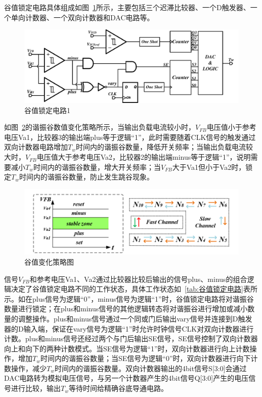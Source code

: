 谷值锁定电路具体组成如图~\ref{fig:谷值锁定电路1}所示，主要包括三个迟滞比较器、一个D触发器、一个单向计数器、一个双向计数器和DAC电路等。

\begin{figure}[htbp] 
    \centering
    \includegraphics[width=0.8\linewidth]{figures/谷值锁定电路1.pdf}
    \caption{谷值锁定电路1}
    \label{fig:谷值锁定电路1}
\end{figure} 

如图~\ref{fig:谷值变化策略}的谐振谷数值变化策略所示，当输出负载电流较小时，$V_{FB}$电压值小于参考电压Va1，比较器3的输出端plus等于逻辑“1”，此时需要随着CLK信号的触发通过双向计数器电路增加$T_w$时间内的谐振谷数量，降低开关频率；当输出负载电流较大时，$V_{FB}$电压值大于参考电压Va2，比较器2的输出端minus等于逻辑“1”，说明需要减小$T_w$时间内的谐振谷数量，增大开关频率；当$V_{FB}$大于Va1但小于Va2时，锁定$T_w$时间内的谐振谷数量，防止发生跳谷现象。

\begin{figure}[htbp] 
    \centering
    \includegraphics[width=0.8\linewidth]{figures/谷值变化策略.png}
    \caption{谷值变化策略图}
    \label{fig:谷值变化策略}
\end{figure} 

信号$V_{FB}$和参考电压Va1、Va2通过比较器比较后输出的信号plus、minus的组合逻辑决定了谷值锁定电路不同的工作状态，具体工作状态如~\ref{tab:谷值锁定电路}表所示。如在plus信号为逻辑“0”，minus信号为逻辑“1”时，谷值锁定电路将对谐振谷数量进行锁定；在plus和minus信号的其他逻辑转态将对谐振谷进行增加或减小数量的调整操作。plus和minus信号通过一个同或门后输出vary信号并连接到D触发器的D输入端，保证在vary信号为逻辑“1”时允许时钟信号CLK对双向计数器进行计数。plus和minus信号还经过两个与门后输出SE信号，SE信号控制了双向计数器向上和向下的两种计数模式。当SE信号为逻辑“1”时，双向计数器进行向上计数操作，增加$T_w$时间内的谐振谷数量；当SE信号为逻辑“0”时，双向计数器进行向下计数操作，减少$T_w$时间内的谐振谷数量。双向计数器输出的4bit信号S[3:0]会通过DAC电路转为模拟电压信号，与另一个计数器产生的4bit信号Q[3:0]产生的电压信号进行比较，输出$T_w$等待时间给精确谷底导通电路。


